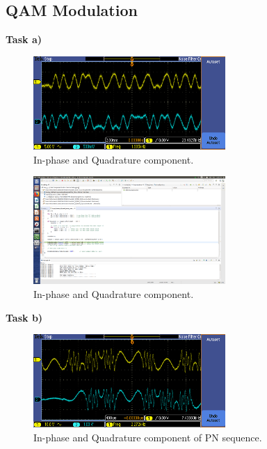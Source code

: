 \documentclass{article}
\begin{document}
\subsection{QAM Modulation}

\textbf{Task a)}
\begin{figure}[h]
  \begin{center}
    \includegraphics[width=0.65\textwidth]{img/task_a_oscilloscope.png}
    \caption{In-phase and Quadrature component.}
  \end{center}
\end{figure}

\begin{figure}[h]
  \begin{center}
    \includegraphics[width=0.65\textwidth]{img/task_a_profile.png}
    \caption{In-phase and Quadrature component.}
  \end{center}
\end{figure}

\pagebreak
\textbf{Task b)}

\begin{figure}[h]
  \begin{center}
    \includegraphics[width=0.65\textwidth]{img/task_b_oscilloscope.png}
    \caption{In-phase and Quadrature component of PN sequence.}
  \end{center}
\end{figure}
\end{document}
